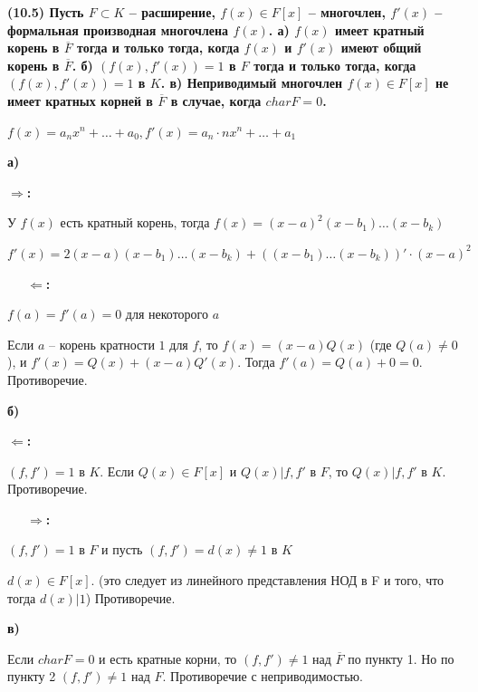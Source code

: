 \textbf{(10.5) Пусть $F \subset K$ -- расширение, $f(x) \in F[x]$ -- многочлен, $f'(x)$ -- формальная производная
многочлена $f(x)$.
а) $f(x)$ имеет кратный корень в $\overline{F}$ тогда и только тогда, когда $f(x)$ и $f'(x)$ имеют общий корень в $\overline{F}$.
б) $(f(x), f'(x)) = 1$ в $F$ тогда и только тогда, когда $(f(x), f'(x)) = 1$ в $K$.
в) Неприводимый многочлен $f(x) \in F[x]$ не имеет кратных корней в $\overline{F}$ в случае, когда $char F = 0$.}

$f(x) = a_nx^n + \ldots + a_0, f'(x) = a_n \cdot nx^n + \ldots + a_1$

\textbf{а)}

\Proof \textbf{$\Rightarrow$:}

У $f(x)$ есть кратный корень, тогда $f(x) = (x - a)^2(x-b_1)\ldots(x-b_k)$

$f'(x) = 2(x-a)(x-b_1)\ldots(x-b_k) + ((x-b_1)\ldots(x-b_k))' \cdot (x-a)^2$

\ \ \ \textbf{$\Leftarrow$:}

$f(a)=f'(a)=0$ для некоторого $a$

Если $a$ -- корень кратности $1$ для $f$, то $f(x) = (x-a)Q(x)$ (где $Q(a) \neq 0$), и $f'(x) = Q(x) + (x-a)Q'(x)$. Тогда $f'(a) = Q(a) + 0 = 0$. Противоречие.
\EndProof

\textbf{б)}

\Proof \textbf{$\Leftarrow$:}

$(f, f') = 1$ в $K$. Если $Q(x) \in F[x]$ и $Q(x)|f, f'$ в $F$, то $Q(x)|f, f'$ в $K$. Противоречие.

\ \ \ \textbf{$\Rightarrow$:}

$(f, f') = 1$ в $F$ и пусть $(f, f') = d(x) \neq 1$ в $K$

$d(x) \in F[x]$. (это следует из линейного представления НОД в F и того, что тогда $d(x)|1$) Противоречие.
\EndProof

\textbf{в)}

\Proof
Если $char F = 0$ и есть кратные корни, то $(f, f') \neq 1$ над $\overline{F}$ по пункту 1. Но по пункту 2 $(f, f') \neq 1$ над $F$. Противоречие с неприводимостью.
\EndProof
